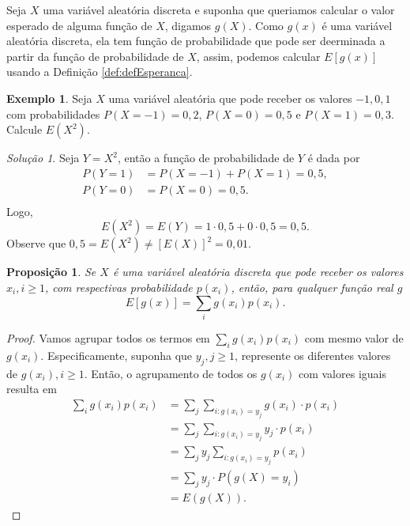 \documentclass[]{book}
\newtheorem{proposition}{Proposição}[chapter]
\theoremstyle{definition}
\theoremstyle{definition}
\newtheorem{example}{Exemplo}[chapter]
\theoremstyle{definition}
\theoremstyle{remark}
\newtheorem*{solution}{Solução}
\begin{document}
Seja \(X\) uma variável aleatória discreta e suponha que queriamos calcular o valor esperado de alguma função de \(X\), digamos \(g(X)\).
Como \(g(x)\) é uma variável aleatória discreta, ela tem função de probabilidade que pode ser deerminada a partir da função de probabilidade de \(X\), assim, podemos calcular \(E[g(x)]\) usando a Definição \ref{def:defEsperanca}.

\begin{example}
\protect\hypertarget{exm:exX2}{}{\label{exm:exX2} }Seja \(X\) uma variável aleatória que pode receber os valores \(-1, 0, 1\) com probabilidades \(P(X=-1)=0{,}2\), \(P(X=0)=0{,}5\) e \(P(X=1)=0{,}3\).
Calcule \(E(X^2)\).
\end{example}

\begin{solution}
\iffalse{} {Solução. } \fi{}Seja \(Y=X^2\), então a função de probabilidade de \(Y\) é dada por
\begin{align}
P(Y=1) &= P(X=-1) + P(X=1) = 0{,}5,\\ 
P(Y=0) &= P(X=0) = 0{,}5.\\ 
\end{align}
Logo,
\[E(X^2) = E(Y) = 1\cdot 0{,}5 + 0\cdot 0{,}5 = 0{,}5.\]
Observe que \(0{,}5 = E(X^2) \neq [E(X)]^2 = 0{,}01\).
\end{solution}

\begin{proposition}
\protect\hypertarget{prp:propGx}{}{\label{prp:propGx} }Se \(X\) é uma variável aleatória discreta que pode receber os valores \(x_i, i\geq 1\), com respectivas probabilidade \(p(x_i)\), então, para qualquer função real \(g\)
\[E[g(x)] = \sum_i g(x_i)p(x_i).\]
\end{proposition}

\begin{proof}
\iffalse{} {Prova. } \fi{}Vamos agrupar todos os termos em \(\sum_i g(x_i)p(x_i)\) com mesmo valor de \(g(x_i)\).
Especificamente, suponha que \(y_j, j\geq 1\), represente os diferentes valores de \(g(x_i), i\geq 1\).
Então, o agrupamento de todos os \(g(x_i)\) com valores iguais resulta em
\begin{align}
\sum_i g(x_i)p(x_i) &= \sum_j \sum_{i:g(x_i)=y_j} g(x_i)\cdot p(x_i)\\
&=\sum_j \sum_{i:g(x_i)=y_j} y_j\cdot p(x_i)\\
&=\sum_j y_j \sum_{i:g(x_i)=y_j} p(x_i)\\
&=\sum_j y_j \cdot P(g(X)=y_i)\\
&= E(g(X)).
\end{align}
\end{proof}
\end{document}
